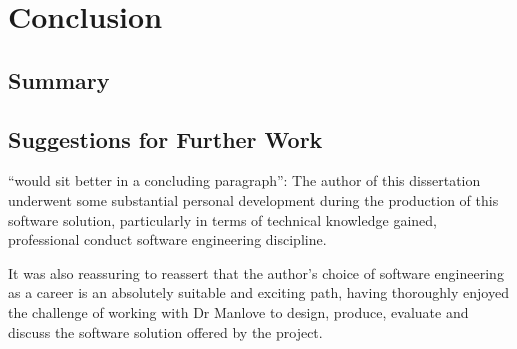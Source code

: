 \chapter{Conclusion}
\label{conclusion}

\section{Summary}

\section{Suggestions for Further Work}



``would sit better in a concluding paragraph'':
The author of this dissertation underwent some substantial personal development during the production of this software solution, particularly in terms of technical knowledge gained, professional conduct software engineering discipline.

It was also reassuring to reassert that the author's choice of software engineering as a career is an absolutely suitable and exciting path, having thoroughly enjoyed the challenge of working with Dr Manlove to design, produce, evaluate and discuss the software solution offered by the project.